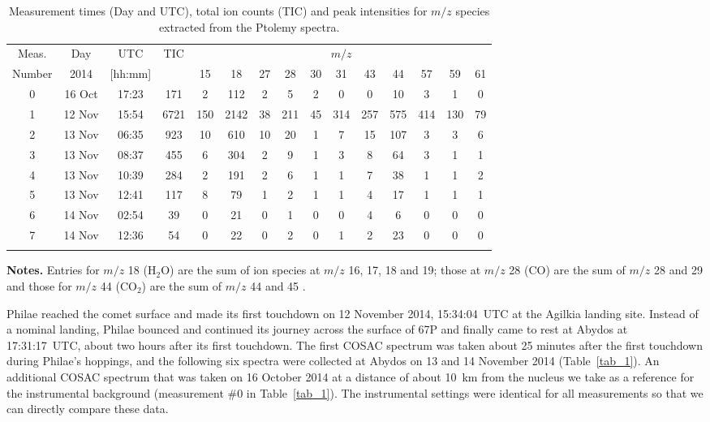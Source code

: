 \documentclass{aa}
\begin{document}
\begin{table*}
   \centering
      \caption{Measurement times (Day and UTC), total ion counts (TIC) and peak intensities for $m/z$ species extracted from 
      the Ptolemy spectra. }
   \begin{tabular}{@{} ccccccccccccccc @{}} 
   \hline      
   \hline
Meas.     &    Day     &   UTC &   TIC & \multicolumn{11}{c}{$m/z$} \\
Number    &   2014     & [hh:mm] &       & 15 &     18 & 27 & 28  & 30  &  31 &  43 & 44  & 57 & 59 & 61 \\
\hline
      0       & 16 Oct & 17:23 &  171  &  2 &    112 &  2  &  5 &  2  &   0 &   0 & 10  &  3  &  1  & 0  \\
      1       & 12 Nov & 15:54 & 6721 & 150 &   2142 & 38 & 211& 45 & 314& 257& 575 & 414& 130& 79 \\
      2       & 13 Nov & 06:35 &  923  & 10 &    610 & 10 &  20&  1 &   7& 15 & 107 &   3&   3& 6 \\
      3       & 13 Nov & 08:37 &  455  &  6 &    304 &  2 &   9&  1 &  3 & 8  &  64 &   3&  1 & 1 \\
      4       & 13 Nov & 10:39 &  284  &  2 &    191 &  2 &   6&  1 &  1 & 7  &  38 &   1& 1  & 2   \\
      5       & 13 Nov & 12:41 &  117  &  8 &     79 &  1 &   2&  1 & 1  & 4  &  17 &   1& 1  & 1  \\
      6       & 14 Nov & 02:54 &   39  &  0 &     21 &  0 &   1&  0 & 0  & 4  &   6 &   0& 0  & 0  \\
      7       & 14 Nov & 12:36 &   54  &  0 &     22 &  0 &  2 &  0 & 1  & 2  &  23 &   0& 0  & 0  \\
      \hline
      &  &  &     &   &      &   &   &   &   &  &   &   &   &   \\
         \end{tabular}
         
         {\bf Notes.} Entries for $m/z$ 18 ($\mathrm{H_2O}$) are the sum of ion species at $m/z$ 16, 17, 18 and 19; those
      at $m/z$ 28 (CO) are the sum of $m/z$ 28 and 29 and those for $m/z$ 44 ($\mathrm{CO_2}$) are the sum of $m/z$ 44 and 45 \citep{morse2015}.
   \label{tab_1a}
\end{table*}


Philae reached the comet surface and made its first touchdown on 12 November 2014, 15:34:04~UTC at the 
Agilkia landing site. Instead of a nominal landing, Philae bounced and continued its journey across the 
surface of 67P and 
finally came to rest at Abydos at 17:31:17~UTC, about two hours after its first touchdown. The first 
COSAC spectrum was taken about 25 minutes after the first touchdown during Philae's hoppings, and 
the following six spectra were collected at Abydos on 13 and 14 November 2014 (Table~\ref{tab_1}). An 
additional COSAC spectrum that was taken on 16 October 2014 at a distance of about 10~km from the nucleus 
we take as a reference for the instrumental background  (measurement \#0 in Table~\ref{tab_1}). 
The instrumental settings 
were identical for all  measurements so that we can directly compare these data.
\end{document}
